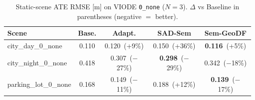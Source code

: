 \begin{table}[t]
\centering
\caption{Static-scene ATE RMSE [m] on VIODE \texttt{0\_none} (\(N{=}3\)).
\(\Delta\) vs Baseline in parentheses (negative $=$ better).}
\label{tab:static_safety}
\setlength{\tabcolsep}{2.8pt}
{\footnotesize
\begin{tabular}{lcccc}
\toprule
Scene & Base. & Adapt. & SAD-Sem & Sem-GeoDF \\
\midrule
city\_day\_0\_none
  & 0.110
  & 0.120~(+9\%)
  & 0.150~(+36\%)
  & \textbf{0.116}~(+5\%) \\
city\_night\_0\_none
  & 0.418
  & 0.307~($-$27\%)
  & \textbf{0.298}~($-$29\%)
  & 0.342~($-$18\%) \\
parking\_lot\_0\_none
  & 0.168
  & 0.149~($-$11\%)
  & 0.188~(+12\%)
  & \textbf{0.139}~($-$17\%) \\
\bottomrule
\end{tabular}}
\end{table}
